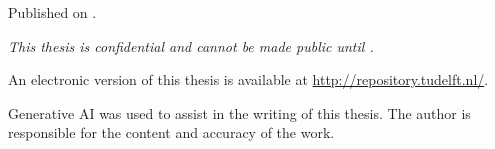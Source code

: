 \begin{titlepage}
\begin{center}
        \bigskip
        \bigskip
        Published on \thePublishDate.

        \bigskip
        \bigskip
        \emph{This thesis is confidential and cannot be made public until \thePublicDate.}

        \bigskip
        \bigskip
        An electronic version of this thesis is available at \url{http://repository.tudelft.nl/}.

        \bigskip
        \bigskip
        Generative AI was used to assist in the writing of this thesis. The author is responsible for the content and accuracy of the work.

    \end{center}


\end{titlepage}
